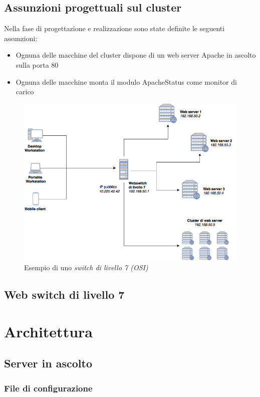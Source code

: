 \documentclass[italian]{tktltiki2}
\begin{document}
\subsection{Assunzioni progettuali sul cluster}
Nella fase di progettazione e realizzazione sono state definite le seguenti assunzioni:
\begin{itemize}
	\item Ognuna delle macchine del cluster dispone di un web server Apache in ascolto sulla porta 80
	\item Ognuna delle macchine monta il modulo ApacheStatus come monitor di carico
\end{itemize}


\begin{figure}
\centering
\includegraphics[width=\textwidth]{images/switch7}
\caption{Esempio di uno \emph{switch di livello 7 (OSI)}}
\end{figure}

\subsection{Web switch di livello 7}

\newpage
\section{Architettura}

\subsection{Server in ascolto}
\subsubsection{File di configurazione}
\label{sec:config}
\end{document}
